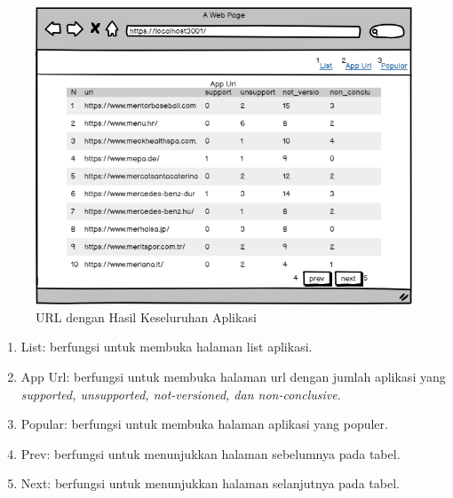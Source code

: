 \begin{figure}[H]
	\centering  
	\includegraphics[scale=0.7]{Gambar/appurl.png}  
	\caption{URL dengan Hasil Keseluruhan Aplikasi} 
	\label{fig:appurl} 
\end{figure}
\begin{enumerate}
	\item List: berfungsi untuk membuka halaman list aplikasi.
	\item App Url: berfungsi untuk membuka halaman url dengan jumlah aplikasi yang \textit{supported, unsupported, not-versioned, dan non-conclusive}.
	\item Popular: berfungsi untuk membuka halaman aplikasi yang populer.
	\item Prev: berfungsi untuk menunjukkan halaman sebelumnya pada tabel.
	\item Next: berfungsi untuk menunjukkan halaman selanjutnya pada tabel. 
\end{enumerate}

